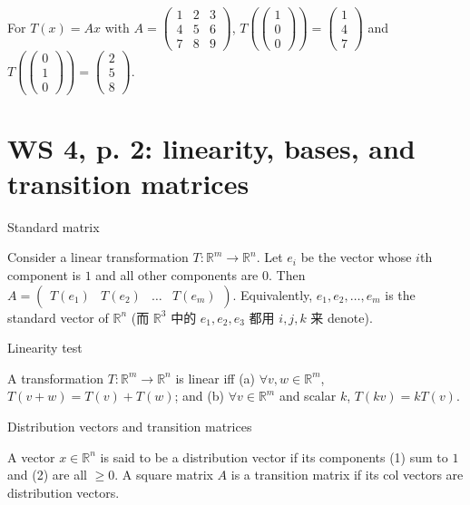 For \(T(x) = Ax\) with \(A = \begin{pmatrix}
1 & 2 & 3 \\
4 & 5 & 6 \\
7 & 8 & 9
\end{pmatrix}\), \(T\left( \begin{pmatrix}
1 \\
0 \\
0
\end{pmatrix} \right) = \begin{pmatrix}
1 \\
4 \\
7
\end{pmatrix}\) and \(T\left( \begin{pmatrix}
0 \\
1 \\
0
\end{pmatrix} \right) = \begin{pmatrix}
2 \\
5 \\
8
\end{pmatrix}\).

\section{WS 4, p. 2: linearity, bases, and transition matrices}

\begin{theorem}{Standard matrix}

Consider a linear transformation \(T:\mathbb{R}^{m}\rightarrow\mathbb{R}^{n}\). Let \(e_{i}\) be the vector whose \(i\)th component is \(1\) and all other components are \(0\). Then \(A = \begin{pmatrix}
{T\left( e_{1} \right)} & {T\left( e_{2} \right)} & \ldots & {T\left( e_{m} \right)}
\end{pmatrix}\). Equivalently, \(e_{1},e_{2},\ldots,e_{m}\) is the standard vector of \(\mathbb{R}^{n}\) (而 \(\mathbb{R}^{3}\) 中的 \(e_{1},e_{2},e_{3}\) 都用 \(i,j,k\) 来 denote).

\end{theorem}

\begin{theorem}{Linearity test}

A transformation \(T:\mathbb{R}^{m}\rightarrow\mathbb{R}^{n}\) is linear iff (a) \(\forall v,w \in \mathbb{R}^{m}\), \(T\left( {v + w} \right) = T(v) + T(w)\); and (b) \(\forall v \in \mathbb{R}^{m}\) and scalar \(k\), \(T\left( {kv} \right) = kT(v)\).

\end{theorem}

\begin{definition}{Distribution vectors and transition matrices}

A vector \(x \in \mathbb{R}^{n}\) is said to be a distribution vector if its components (1) sum to \(1\) and (2) are all \(\geq 0\). A square matrix \(A\) is a transition matrix if its col vectors are distribution vectors.

\end{definition}
